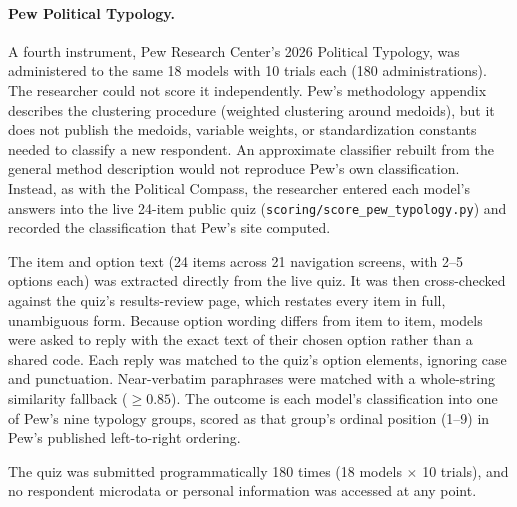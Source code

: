 \documentclass[12pt]{article}
\begin{document}
\paragraph{Pew Political Typology.} A fourth instrument, Pew Research Center's 2026 Political Typology, was
administered to the same 18 models with 10 trials each (180 administrations). The researcher could not
score it independently. Pew's methodology appendix describes the clustering procedure (weighted
clustering around medoids), but it does not publish the medoids, variable weights, or standardization
constants needed to classify a new respondent. An approximate classifier rebuilt from the general
method description would not reproduce Pew's own classification. Instead, as with the Political
Compass, the researcher entered each model's answers into the live 24-item public quiz
(\texttt{scoring/score\_pew\_typology.py}) and recorded the classification that Pew's site computed.

The item and option text (24 items across 21 navigation screens, with 2--5 options each) was extracted
directly from the live quiz. It was then cross-checked against the quiz's results-review page, which
restates every item in full, unambiguous form. Because option wording differs from item to item, models
were asked to reply with the exact text of their chosen option rather than a shared code. Each reply was
matched to the quiz's option elements, ignoring case and punctuation. Near-verbatim paraphrases were
matched with a whole-string similarity fallback ($\geq 0.85$). The outcome is each model's classification into
one of Pew's nine typology groups, scored as that group's ordinal position (1--9) in Pew's published
left-to-right ordering.

The quiz was submitted programmatically 180 times (18 models $\times$ 10 trials), and no
respondent microdata or personal information was accessed at any point.
\end{document}
